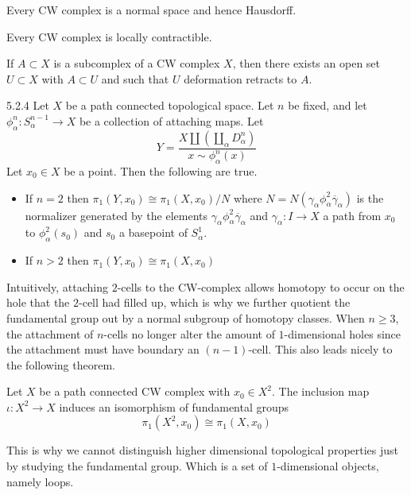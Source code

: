 \documentclass[a4paper]{article}
\begin{document}
\begin{prp}{}{} Every CW complex is a normal space and hence Hausdorff. 
\end{prp}

\begin{prp}{}{} Every CW complex is locally contractible. 
\end{prp}

\begin{prp}{}{} If $A\subset X$ is a subcomplex of a CW complex $X$, then there exists an open set $U\subset X$ with $A\subset U$ and such that $U$ deformation retracts to $A$. 
\end{prp}

\begin{prp}{}{5.2.4} Let $X$ be a path connected topological space. Let $n$ be fixed, and let $\phi_\alpha^n:S_\alpha^{n-1}\to X$ be a collection of attaching maps. Let $$Y=\frac{X\amalg\left(\coprod_{\alpha}D_\alpha^n\right)}{x\sim\phi_\alpha^n(x)}$$ Let $x_0\in X$ be a point. Then the following are true. 
\begin{itemize}
\item If $n=2$ then $\pi_1(Y,x_0)\cong\pi_1(X,x_0)/N$ where $N=N(\gamma_\alpha\phi_\alpha^2\overline{\gamma}_\alpha)$ is the normalizer generated by the elements $\gamma_\alpha\phi_\alpha^2\overline{\gamma}_\alpha$ and $\gamma_\alpha:I\to X$ a path from $x_0$ to $\phi_\alpha^2(s_0)$ and $s_0$ a basepoint of $S_\alpha^1$. 
\item If $n>2$ then $\pi_1(Y,x_0)\cong\pi_1(X,x_0)$
\end{itemize}
\end{prp}

Intuitively, attaching $2$-cells to the CW-complex allows homotopy to occur on the hole that the $2$-cell had filled up, which is why we further quotient the fundamental group out by a normal subgroup of homotopy classes. When $n\geq 3$, the attachment of $n$-cells no longer alter the amount of $1$-dimensional holes since the attachment must have boundary an $(n-1)$-cell. This also leads nicely to the following theorem. 

\begin{thm}{}{} Let $X$ be a path connected CW complex with $x_0\in X^2$. The inclusion map $\iota:X^2\to X$ induces an isomorphism of fundamental groups $$\pi_1(X^2,x_0)\cong\pi_1(X,x_0)$$
\end{thm}

This is why we cannot distinguish higher dimensional topological properties just by studying the fundamental group. Which is a set of $1$-dimensional objects, namely loops. 
\end{document}
